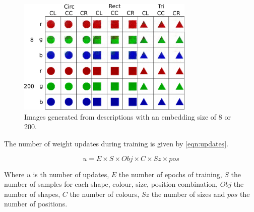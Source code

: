

\begin{figure}
\centering
\includegraphics[width=0.75\textwidth]{Figs/shapes/331_8v200.png}
\caption{Images generated from descriptions with an embedding size of 8 or 200.}
\label{fig:8vs200}
\end{figure}

The number of weight updates during training is given by \autoref{eqn:updates}.

\begin{equation}\label{eqn:updates}
u = E \times S \times Obj \times C \times Sz \times pos
\end{equation}

Where $u$ is th number of updates, $E$ the number of epochs of training, $S$ the number of samples for each shape, colour, size, position combination, $Obj$ the number of shapes, $C$ the number of colours, $Sz$ the number of sizes and $pos$ the number of positions.



